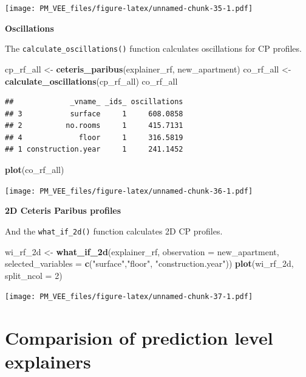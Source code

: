 \documentclass[]{krantz}
\newenvironment{Shaded}{\begin{snugshade}}{\end{snugshade}}
\newcommand{\DataTypeTok}[1]{\textcolor[rgb]{0.13,0.29,0.53}{#1}}
\newcommand{\DecValTok}[1]{\textcolor[rgb]{0.00,0.00,0.81}{#1}}
\newcommand{\KeywordTok}[1]{\textcolor[rgb]{0.13,0.29,0.53}{\textbf{#1}}}
\newcommand{\NormalTok}[1]{#1}
\newcommand{\StringTok}[1]{\textcolor[rgb]{0.31,0.60,0.02}{#1}}
\theoremstyle{definition}
\theoremstyle{definition}
\theoremstyle{definition}
\theoremstyle{remark}
\begin{document}
\texttt{[image: PM\_VEE\_files/figure-latex/unnamed-chunk-35-1.pdf]}

\textbf{Oscillations}

The \texttt{calculate\_oscillations()} function calculates oscillations
for CP profiles.

\begin{Shaded}
\begin{Highlighting}[]
\NormalTok{cp_rf_all <-}\StringTok{ }\KeywordTok{ceteris_paribus}\NormalTok{(explainer_rf, new_apartment)}
\NormalTok{co_rf_all <-}\StringTok{ }\KeywordTok{calculate_oscillations}\NormalTok{(cp_rf_all)}
\NormalTok{co_rf_all}
\end{Highlighting}
\end{Shaded}

\begin{verbatim}
##             _vname_ _ids_ oscillations
## 3           surface     1     608.0858
## 2          no.rooms     1     415.7131
## 4             floor     1     316.5819
## 1 construction.year     1     241.1452
\end{verbatim}

\begin{Shaded}
\begin{Highlighting}[]
\KeywordTok{plot}\NormalTok{(co_rf_all)}
\end{Highlighting}
\end{Shaded}

\texttt{[image: PM\_VEE\_files/figure-latex/unnamed-chunk-36-1.pdf]}

\textbf{2D Ceteris Paribus profiles}

And the \texttt{what\_if\_2d()} function calculates 2D CP profiles.

\begin{Shaded}
\begin{Highlighting}[]
\NormalTok{wi_rf_2d <-}\StringTok{ }\KeywordTok{what_if_2d}\NormalTok{(explainer_rf, }\DataTypeTok{observation =}\NormalTok{ new_apartment, }
                 \DataTypeTok{selected_variables =} \KeywordTok{c}\NormalTok{(}\StringTok{"surface"}\NormalTok{,}\StringTok{"floor"}\NormalTok{, }\StringTok{"construction.year"}\NormalTok{))}
\KeywordTok{plot}\NormalTok{(wi_rf_2d, }\DataTypeTok{split_ncol =} \DecValTok{2}\NormalTok{)}
\end{Highlighting}
\end{Shaded}

\texttt{[image: PM\_VEE\_files/figure-latex/unnamed-chunk-37-1.pdf]}

\hypertarget{comparision-of-prediction-level-explainers}{%
\section{Comparision of prediction level
explainers}\label{comparision-of-prediction-level-explainers}}
\end{document}
